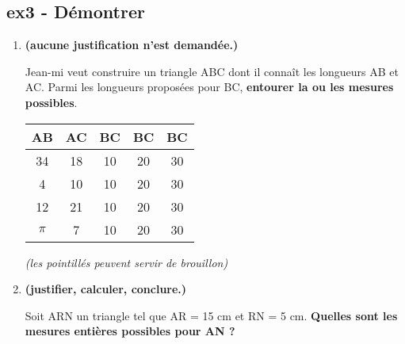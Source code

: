 \subsection*{ex3 - Démontrer}

\begin{enumerate}
  \item[1.] \textbf{(aucune justification n'est demandée.)}

    Jean-mi veut construire un triangle ABC dont il connaît les longueurs AB et AC. \newline
    Parmi les longueurs proposées pour BC, \textbf{entourer la ou les mesures possibles}.

    \begin{multicols}{2}
      \begin{tabular}{|c|c||c|c|c|}
        \hline
          AB & AC & BC & BC & BC\\ \hline
          34 & 18 & 10 & 20 & 30\\ \hline
            4 & 10 & 10 & 20 & 30\\ \hline
          12 & 21 & 10 & 20 & 30\\ \hline
        $\pi$ &  7 & 10 & 20 & 30\\ \hline
      \end{tabular}
      
      \columnbreak

      \textit{(les pointillés peuvent servir de brouillon)}
      \Pointilles[4]
    \end{multicols}

  \item[2.] \textbf{(justifier, calculer, conclure.)}
  
  Soit ARN un triangle tel que AR = 15 cm et RN = 5 cm. \newline
  \textbf{Quelles sont les mesures entières possibles pour AN ?}

  \Pointilles[6]
\end{enumerate} 



